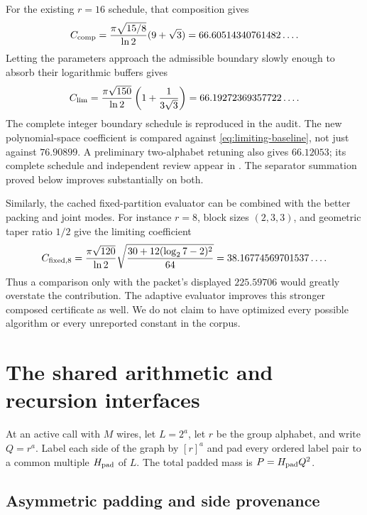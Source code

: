 \documentclass[11pt]{article}
\theoremstyle{definition}\newtheorem{definition}[theorem]{Definition}
\theoremstyle{remark}\newtheorem{remark}[theorem]{Remark}
\newcommand{\smallpath}[1]{{\small\path{#1}}}
\begin{document}
For the existing $r=16$ schedule, that composition gives
\begin{equation}
 C_{\rm comp}=\frac{\pi\sqrt{15/8}}{\ln2}(9+\sqrt3)
 =66.60514340761482\ldots.\label{eq:composed-baseline}
\end{equation}
Letting the parameters approach the admissible boundary slowly enough to
absorb their logarithmic buffers gives
\begin{equation}
 C_{\rm lim}=\frac{\pi\sqrt{150}}{\ln2}
 \left(1+\frac1{3\sqrt3}\right)
 =66.19272369357722\ldots.\label{eq:limiting-baseline}
\end{equation}
The complete integer boundary schedule is reproduced in the audit.
The new polynomial-space coefficient is compared against
\eqref{eq:limiting-baseline}, not just against $76.90899$. A preliminary
two-alphabet retuning also gives $66.12053$; its complete schedule and
independent review appear in \smallpath{audit/two_alphabet_review.md}.
The separator summation proved below improves substantially on both.

Similarly, the cached fixed-partition evaluator can be combined with the
better packing and joint modes. For instance $r=8$, block sizes $(2,3,3)$,
and geometric taper ratio $1/2$ give the limiting coefficient
\begin{equation}
 C_{\rm fixed,8}=\frac{\pi\sqrt{120}}{\ln2}
 \sqrt{\frac{30+12(\log_2 7-2)^2}{64}}
 =38.16774569701537\ldots.\label{eq:fixed-composed}
\end{equation}
Thus a comparison only with the packet's displayed $225.59706$ would greatly
overstate the contribution. The adaptive evaluator improves this stronger
composed certificate as well. We do not claim to have optimized every
possible algorithm or every unreported constant in the corpus.

\section{The shared arithmetic and recursion interfaces}
\label{sec:interfaces}

At an active call with $M$ wires, let $L=2^a$, let $r$ be the group alphabet,
and write $Q=r^a$. Label each side of the graph by $[r]^a$ and pad every
ordered label pair to a common multiple $H_{\rm pad}$ of $L$. The total padded
mass is $P=H_{\rm pad}Q^2$.

\subsection{Asymmetric padding and side provenance}
\end{document}
